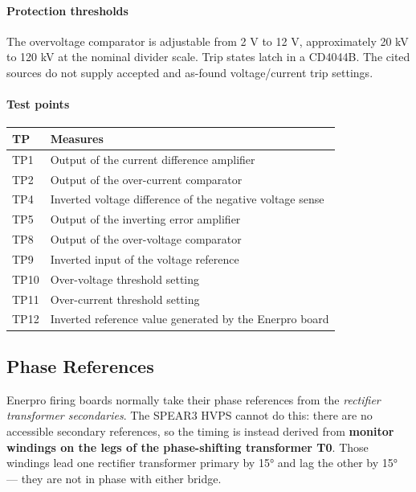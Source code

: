 \paragraph{Protection thresholds}\label{protection-thresholds}

The overvoltage comparator is adjustable from 2 V to 12 V, approximately 20 kV to 120 kV at the nominal divider scale. Trip states latch in a CD4044B. The cited sources do not supply accepted and as-found voltage/current trip settings.

\paragraph{Test points}\label{test-points}

\begin{longtable}[]{@{}ll@{}}
\toprule\noalign{}
TP & Measures \\
\midrule\noalign{}
\endhead
\bottomrule\noalign{}
\endlastfoot
TP1 & Output of the current difference amplifier \\
TP2 & Output of the over-current comparator \\
TP4 & Inverted voltage difference of the negative voltage sense \\
TP5 & Output of the inverting error amplifier \\
TP8 & Output of the over-voltage comparator \\
TP9 & Inverted input of the voltage reference \\
TP10 & Over-voltage threshold setting \\
TP11 & Over-current threshold setting \\
TP12 & Inverted reference value generated by the Enerpro board \\
\end{longtable}

\subsection{Phase References}\label{sec:phase-references}

Enerpro firing boards normally take their phase references from the \emph{rectifier transformer secondaries}. The SPEAR3 HVPS cannot do this: there are no accessible secondary references, so the timing is instead derived from \textbf{monitor windings on the legs of the phase-shifting transformer T0}. Those windings lead one rectifier transformer primary by 15° and lag the other by 15° --- they are not in phase with either bridge.

